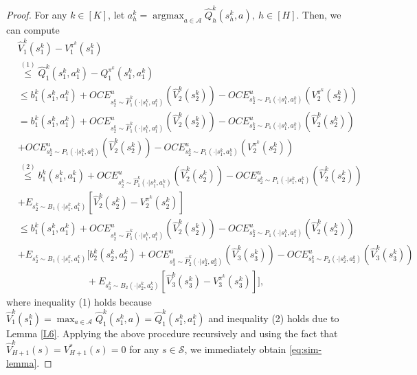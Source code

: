 \documentclass[11pt]{article}
\newcommand{\1}{\mathbbm{1}}
\begin{document}
\begin{proof}
For any $k\in [K]$, let $a^k_h=\mathop{\arg\max}_{a\in\mathcal{A}}\hat{Q}^k_h(s_h^k,a),\ h\in [H]$. Then, we can compute 
\begin{align*}
&\hat{V}_1^k(s_1^k)-V_1^{\pi^k}(s_1^k)\\
& \overset{(1)}{\leq} \hat{Q}^k_1(s_1^k,a_1^k)-Q_1^{\pi^k}(s_1^k,a_1^k)\\
&\leq  b_1^k(s_1^k,a_1^k)+OCE^u_{s_{2}^k\sim \hat{P}_1^k(\cdot\vert s_1^k,a_1^k)}(\hat{V}_2^k(s_2^k))-OCE^u_{s_{2}^k\sim P_1(\cdot\vert s_1^k,a_1^k)}(V_2^{\pi^k}(s_2^k))\\
&=b_1^k(s_1^k,a_1^k)+OCE^u_{s_{2}^k\sim \hat{P}_1^k(\cdot\vert s_1^k,a_1^k)}(\hat{V}_2^k(s_2^k))-OCE^u_{s_{2}^k\sim P_1(\cdot\vert s_1^k,a_1^k)}(\hat{V}_2^{k}(s_2^k))\\
&+OCE^u_{s_{2}^k\sim P_1(\cdot\vert s_1^k,a_1^k)}(\hat{V}_2^{k}(s_2^k))-OCE^u_{s_{2}^k\sim P_1(\cdot\vert s_1^k,a_1^k)}(V_2^{\pi^k}(s_2^k))\\
&\overset{(2)}{\leq}  b_1^k(s_1^k,a_1^k)+OCE^u_{s_{2}^k\sim \hat{P}_1^k(\cdot\vert s_1^k,a_1^k)}(\hat{V}_2^k(s_2^k))-OCE^u_{s_{2}^k\sim P_1(\cdot\vert s_1^k,a_1^k)}(\hat{V}_2^{k}(s_2^k))\\
&+E_{s_2^k\sim B_1(\cdot\vert s_1^k,a_1^k)}\left [\hat{V}^k_2(s_2^k)-V_2^{\pi^k}(s_2^k)\right ]\\
&\leq  b_1^k(s_1^k,a_1^k)+OCE^u_{s_{2}^k\sim \hat{P}_1^k(\cdot\vert s_1^k,a_1^k)}(\hat{V}_2^k(s_2^k))-OCE^u_{s_{2}^k\sim P_1(\cdot\vert s_1^k,a_1^k)}(\hat{V}_2^{k}(s_2^k))\\
&+E_{s_2^k\sim B_1(\cdot\vert s_1^k,a_1^k)}\Big [b_2^k(s_2^k,a_2^k)+OCE^u_{s_{3}^k\sim \hat{P}_2^k(\cdot\vert s_2^k,a_2^k)}(\hat{V}_3^k(s_3^k))-OCE^u_{s_{3}^k\sim P_2(\cdot\vert s_2^k,a_2^k)}(\hat{V}_3^{k}(s_3^k)) \\
& \hspace{3cm} +E_{s_3^k\sim B_2(\cdot\vert s_2^k,a_2^k)}\left [\hat{V}^k_3(s_3^k)-V_3^{\pi^k}(s_3^k)\right ] \Big ],
\end{align*}
where inequality (1) holds because $\hat{V}_1^k(s_1^k)= \max_{a\in \mathcal{A}} \hat{Q}^k_1(s_1^k,a)=\hat{Q}^k_1(s_1^k,a_1^k)$ and inequality (2) holds due to Lemma \ref{L6}. Applying the above procedure recursively and using the fact that $\hat{V}_{H+1}^k(s)=V_{H+1}^*(s)=0$ for any $s\in\mathcal{S}$, we immediately obtain \eqref{eq:sim-lemma}. 
\end{proof}
\end{document}
